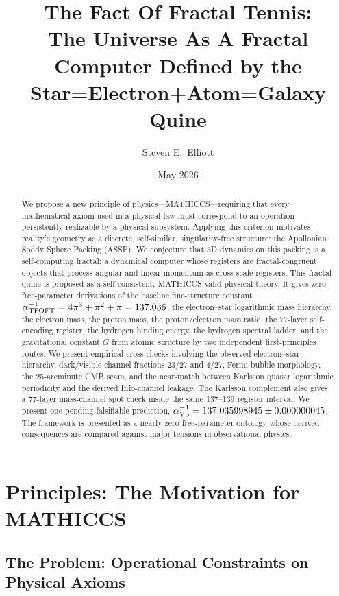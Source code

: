 \documentclass[11pt,a4paper]{article}
\title{The Fact Of Fractal Tennis: \\
The Universe As A Fractal Computer Defined by the \\
Star=Electron+Atom=Galaxy Quine}
\author{Steven E.\ Elliott}
\date{May 2026}
\begin{document}
\maketitle
\begin{abstract}
  We propose a new principle of physics---MATHICCS---requiring that every mathematical axiom used in a physical law must correspond to an operation persistently realizable by a physical subsystem. Applying this criterion motivates reality's geometry as a discrete, self-similar, singularity-free structure: the Apollonian--Soddy Sphere Packing (ASSP). We conjecture that 3D dynamics on this packing is a self-computing fractal: a dynamical computer whose registers are fractal-congruent objects that process angular and linear momentum as cross-scale registers. This fractal quine is proposed as a self-consistent, MATHICCS-valid physical theory. It gives zero-free-parameter derivations of the baseline fine-structure constant \(\alpha^{-1}_{\rm TFOFT}=4\pi^3+\pi^2+\pi=137.036\), the electron--star logarithmic mass hierarchy, the electron mass, the proton mass, the proton/electron mass ratio, the 77-layer self-encoding register, the hydrogen binding energy, the hydrogen spectral ladder, and the gravitational constant \(G\) from atomic structure by two independent first-principles routes. We present empirical cross-checks involving the observed electron--star hierarchy, dark/visible channel fractions \(23/27\) and \(4/27\), Fermi-bubble morphology, the 25-arcminute CMB seam, and the near-match between Karlsson quasar logarithmic periodicity and the derived Info-channel leakage. The Karlsson complement also gives a 77-layer mass-channel spot check inside the same 137--139 register interval. We present one pending falsifiable prediction, \(\alpha^{-1}_{\rm Yb}=137.035998945\pm0.000000045\). The framework is presented as a nearly zero free-parameter ontology whose derived consequences are compared against major tensions in observational physics.
\end{abstract}



\section{Principles: The Motivation for MATHICCS}

\subsection{The Problem: Operational Constraints on Physical Axioms}
\end{document}
